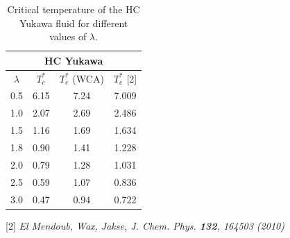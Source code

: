 \documentclass[8pt]{beamer}
\begin{document}
\begin{frame}
\begin{columns}
\begin{column}{0.5\textwidth}
				\begin{table}[h]
					\noindent\caption{Critical temperature of the HC Yukawa fluid for different values of $\lambda$.}\vskip3mm
					\begin{tabular}{|c|c|c|c|}
						\hline
						\multicolumn{4}{|c|}{HC Yukawa}\\
						\hline
						$\lambda$ & $T_c^*$ & $T_c^*$ (WCA)& $T_c^*$ [2] \\
						\hline
						0.5 & 6.15 & 7.24 & 7.009 \\
						1.0 & 2.07 & 2.69 & 2.486 \\
						1.5 & 1.16 & 1.69 & 1.634 \\
						1.8 & 0.90 & 1.41 & 1.228 \\
						2.0 & 0.79 & 1.28 & 1.031 \\
						2.5 & 0.59 & 1.07 & 0.836 \\
						3.0 & 0.47 & 0.94 & 0.722 \\
						\hline
					\end{tabular}
					\label{tab:yukawa_temp_cr}
				\end{table}
				
				[2] \textit{El Mendoub, Wax, Jakse, J. Chem. Phys. \textbf{132}, 164503 (2010)}
			\end{column}
			
			
		\end{columns}
		
				
	\end{frame}
	
\end{document}
